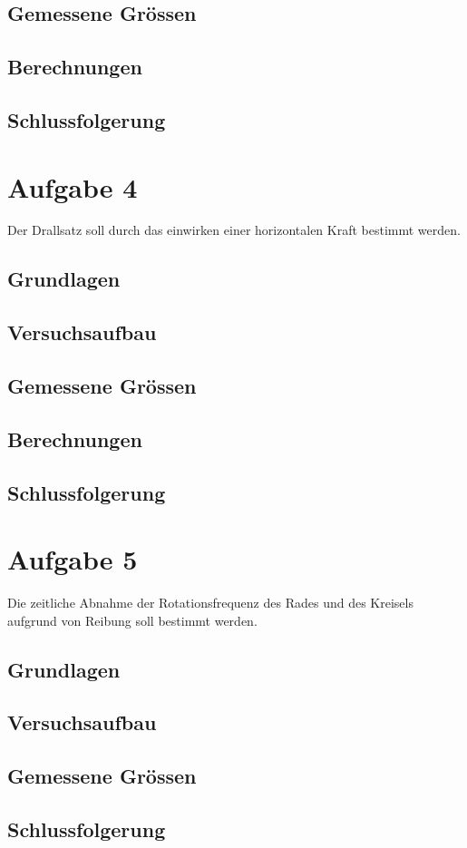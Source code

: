 \documentclass{article}
\begin{document}
\subsection{Gemessene Grössen}
\subsection{Berechnungen}
\subsection{Schlussfolgerung}

\section{Aufgabe 4}
Der Drallsatz soll durch das einwirken einer horizontalen Kraft bestimmt werden.
\subsection{Grundlagen}
\subsection{Versuchsaufbau}
\subsection{Gemessene Grössen}
\subsection{Berechnungen}
\subsection{Schlussfolgerung}

\section{Aufgabe 5}

Die zeitliche Abnahme der Rotationsfrequenz des Rades und des Kreisels aufgrund von
Reibung soll bestimmt werden.
\subsection{Grundlagen}
\subsection{Versuchsaufbau}
\subsection{Gemessene Grössen}
\subsection{Schlussfolgerung}
\end{document}
